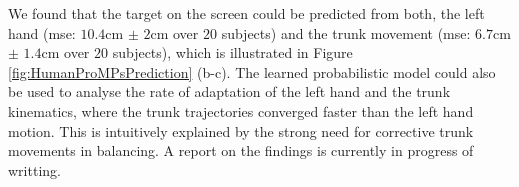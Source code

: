 We found that the target on the screen could be predicted from both, the left hand (mse: $10.4$cm $\pm$ $2$cm over $20$ subjects) and the trunk movement (mse: $6.7$cm $\pm$ $1.4$cm over $20$ subjects), which 
is illustrated in Figure \ref{fig:HumanProMPsPrediction} (b-c). 
The learned probabilistic model could also be used to analyse the rate of adaptation of the left hand and the trunk kinematics, 
where the trunk trajectories converged faster than the left hand motion. 
This is intuitively explained by the strong need for corrective trunk movements in balancing. 
A report on the findings is currently in progress of writting.


